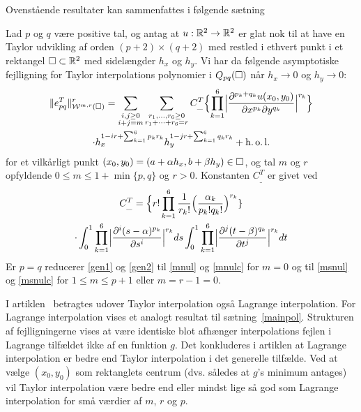 Ovenstående resultater kan sammenfattes i følgende sætning
\begin{theorem} \label{mainpol}
Lad $p$ og $q$ være positive tal, og antag at $u:\mathbb{R}^2 \rightarrow
\mathbb{R}^2$ er glat nok til at have en Taylor udvikling af orden
$(p+2)\times (q+2)$ med restled i ethvert punkt i et rektangel
$\Box\subset\mathbb{R}^2$ med sidelængder $h_x$ og $h_y$. Vi har da følgende
asymptotiske fejlligning for Taylor interpolations polynomier i
$Q_{pq}(\Box)$ når $h_x \rightarrow 0$ og $h_y \rightarrow 0$:
\begin{multline} \label{gen1}
  \|e_{pq}^T\|_{{\mathcal W}^{m,r}(\Box)}^r = \sum_{\substack{ i,j\geq 0 \\ i+j=m }}
  \sum_{\substack{ r_1,\ldots ,r_6 \geq 0 \\ r_1+\cdots +r_6=r}}
  C_{\_}^T \Bigl\{ \prod_{k=1}^6 \Bigl|
  \frac{\partial^{p_k+q_k}u(x_0,y_0)}{\partial x^{p_k}\partial y^{q_k}}
  \Bigl|^{r_k} \Bigl\} \\
  \cdot h_x^{1-ir+\sum_{k=1}^6 p_k r_k}
  h_y^{1-jr+\sum_{k=1}^6 q_k r_k} + \operatorname{h.o.l.}
\end{multline}
for et vilkårligt punkt $(x_0,y_0)=(a+\alpha h_x, b+\beta h_y)\in\Box$,
og tal $m$ og $r$ opfyldende $0\leq m\leq 1+\min \{p,q\}$ og $r>0$.
Konstanten $C^T_{\_}$ er givet ved
\begin{multline} \label{gen2}
  C_{\_}^T = \Bigl\{ r! \prod_{k=1}^6 \frac{1}{r_k!}
  \Bigl( \frac{\alpha_k}{p_k!q_k!} \Bigr)^{r_k} \} \\ \cdot
  \int_0^1 \prod_{k=1}^6 \Bigl| \frac{\partial^i(s-\alpha)^{p_k}}
  {\partial s^i} \Bigr|^{r_k} ds
  \int_0^1 \prod_{k=1}^6 \Bigl| \frac{\partial^j(t-\beta)^{q_k}}
  {\partial t^j} \Bigr|^{r_k} dt
\end{multline}
Er $p=q$ reducerer \eqref{gen1} og \eqref{gen2} til \eqref{mnul} og
\eqref{mnulc} for $m=0$ og til \eqref{msnul} og \eqref{msnulc} for $1\leq
m\leq p+1$ eller $m=r-1=0$.
\end{theorem}
\begin{remark}
I artiklen~\cite{hugger-pol} betragtes udover Taylor interpolation
også Lag\-range interpolation. For Lagrange interpolation vises et
analogt resultat til sætning~\ref{mainpol}. Strukturen af
fejlligningerne vises at være identiske blot afhænger interpolations
fejlen i Lagrange tilfældet ikke af en funktion $g$. Det konkluderes i
artiklen at Lagrange interpolation er bedre end Taylor interpolation i
det generelle tilfælde. Ved at vælge $(x_0,y_0)$ som rektanglets
centrum (dvs. således at $g$'s minimum antages) vil Taylor
interpolation være bedre end eller mindst lige så god som Lagrange
interpolation for små værdier af $m$, $r$ og $p$.
\end{remark}
